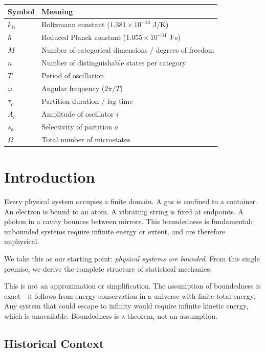 \documentclass[twocolumn,10pt]{article}
\theoremstyle{definition}
\theoremstyle{remark}
\newcommand{\kB}{k_{\mathrm{B}}}
\begin{document}
\begin{center}
\begin{tabular}{ll}
\toprule
\textbf{Symbol} & \textbf{Meaning} \\
\midrule
$\kB$ & Boltzmann constant ($1.381 \times 10^{-23}$ J/K) \\
$\hbar$ & Reduced Planck constant ($1.055 \times 10^{-34}$ J$\cdot$s) \\
$M$ & Number of categorical dimensions / degrees of freedom \\
$n$ & Number of distinguishable states per category \\
$T$ & Period of oscillation \\
$\omega$ & Angular frequency ($2\pi/T$) \\
$\tau_p$ & Partition duration / lag time \\
$A_i$ & Amplitude of oscillator $i$ \\
$s_a$ & Selectivity of partition $a$ \\
$\Omega$ & Total number of microstates \\
\bottomrule
\end{tabular}
\end{center}

\section{Introduction}
\label{sec:introduction}

Every physical system occupies a finite domain. A gas is confined to a container. An electron is bound to an atom. A vibrating string is fixed at endpoints. A photon in a cavity bounces between mirrors. This boundedness is fundamental: unbounded systems require infinite energy or extent, and are therefore unphysical.

We take this as our starting point: \textit{physical systems are bounded}. From this single premise, we derive the complete structure of statistical mechanics.

This is not an approximation or simplification. The assumption of boundedness is exact---it follows from energy conservation in a universe with finite total energy. Any system that could escape to infinity would require infinite kinetic energy, which is unavailable. Boundedness is a theorem, not an assumption.

\subsection{Historical Context}
\end{document}
